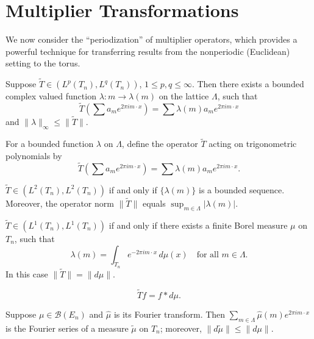 \section{Multiplier Transformations}

We now consider the ``periodization'' of multiplier operators, which provides a powerful technique for transferring results from the nonperiodic (Euclidean) setting to the torus.

\begin{theorem}\label{thm:c7-3-1}
Suppose $\tilde{T} \in (L^p(T_n), L^q(T_n))$, $1 \leq p, q \leq \infty$. Then there exists a bounded complex valued function $\lambda : m \to \lambda(m)$ on the lattice $\Lambda$, such that
\[
\tilde{T}\left(\sum a_m e^{2\pi i m \cdot x}\right) = \sum \lambda(m) a_m e^{2\pi i m \cdot x}
\]
and $\|\lambda\|_\infty \leq \|\tilde{T}\|$.
\end{theorem}

For a bounded function $\lambda$ on $\Lambda$, define the operator $\tilde{T}$ acting on trigonometric polynomials by
\begin{equation}\label{eq:c7-3-2}
\tilde{T}\left(\sum a_m e^{2\pi i m \cdot x}\right) = \sum \lambda(m) a_m e^{2\pi i m \cdot x}.
\end{equation}

\begin{corollary}\label{cor:c7-3-3}
$\tilde{T} \in (L^2(T_n), L^2(T_n))$ if and only if $\{\lambda(m)\}$ is a bounded sequence. Moreover, the operator norm $\|\tilde{T}\|$ equals $\sup_{m \in \Lambda} |\lambda(m)|$.
\end{corollary}

\begin{theorem}\label{thm:c7-3-4}
$\tilde{T} \in (L^1(T_n), L^1(T_n))$ if and only if there exists a finite Borel measure $\mu$ on $T_n$, such that
\[
\lambda(m) = \int_{T_n} e^{-2\pi i m \cdot x}\,d\mu(x) \quad \text{for all } m \in \Lambda.
\]
In this case $\|\tilde{T}\| = \|d\mu\|$.
\end{theorem}

\begin{equation}\label{eq:c7-3-5}
\tilde{T} f = f * d\mu.
\end{equation}

\begin{theorem}\label{thm:c7-3-6}
Suppose $\mu \in \mathcal{B}(E_n)$ and $\hat{\mu}$ is its Fourier transform. Then $\sum_{m \in \Lambda} \hat{\mu}(m) e^{2\pi i m \cdot x}$ is the Fourier series of a measure $\tilde{\mu}$ on $T_n$; moreover, $\|d\tilde{\mu}\| \leq \|d\mu\|$.
\end{theorem}

